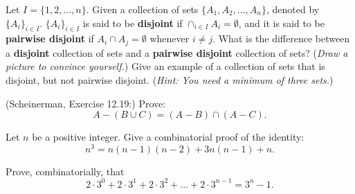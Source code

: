\documentclass{article}
\theoremstyle{definition}
\begin{document}
\begin{question}
   Let $I=\{1, 2, \dots, n\}$. Given a collection of sets $\{A_1,A_2,\dots, A_n\}$, denoted by $\{A_i\}_{i\in I}$. $\{A_i\}_{i\in I}$ is said to be \textbf{disjoint} if $\cap_{i\in I}A_i=\emptyset$, and it is said to be \textbf{pairwise disjoint} if $A_i\cap A_j=\emptyset$ whenever $i\neq j$. What is the difference between a \textbf{disjoint} collection of sets and a \textbf{pairwise disjoint} collection of sets? (\textit{Draw a picture to convince yourself.}) Give an example of a collection of sets that is disjoint, but not pairwise disjoint. (\textit{Hint: You need a minimum of three sets.})
\end{question}
\begin{solution}
\end{solution}


\begin{question}
   (Scheinerman, Exercise 12.19:)
   Prove:
   \[ A-(B\cup C)=(A-B)\cap(A-C).\]
\end{question}
\begin{solution}
\end{solution}


\begin{question}
    Let $n$ be a positive integer.  Give a combinatorial proof of the identity:
    \[ n^3 = n(n-1)(n-2) + 3n(n-1) + n. \]
\end{question}
\begin{solution}
\end{solution}
\begin{solution}
\end{solution}

\begin{question} 
    Prove, combinatorially, that
    \[ 2 \cdot 3^0 + 2 \cdot 3^1 + 2 \cdot 3^2 + \ldots + 2 \cdot 3^{n-1} = 3^n - 1. \]
\end{question}
\begin{solution}
\end{solution}
\end{document}
